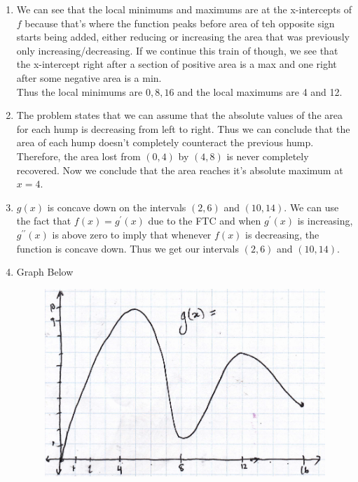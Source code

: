 \documentclass{article}
\begin{document}
\begin{enumerate}[label=\textbf{(2.\arabic*)}]
\begin{enumerate}[label=(\alph*)]
\item We can see that the local minimums and maximums are at the x-intercepts of $f$ because that's where the function peaks before area of teh opposite sign starts being added, either reducing or increasing the area that was previously only increasing/decreasing. If we continue this train of though, we see that the x-intercept right after a section of positive area is a max and one right after some negative area is a min. \\
Thus the local minimums are $0, 8, 16$ and the local maximums are 4 and 12.
\item The problem states that we can assume that the absolute values of the area for each hump is decreasing from left to right. Thus we can conclude that the area of each hump doesn't completely counteract the previous hump. Therefore, the area lost from $(0,4)$ by $(4, 8)$ is never completely recovered. Now we conclude that the area reaches it's absolute maximum at $x=4$.
\item $g(x)$ is concave down on the intervals $(2,6)$ and $(10,14)$. We can use the fact that $f(x)=g^\prime(x)$ due to the FTC and when $g^\prime(x)$ is increasing, $g^{\prime\prime}(x)$ is above zero to imply that whenever $f(x)$ is decreasing, the function is concave down. Thus we get our intervals $(2,6)$ and $(10,14)$.
\item Graph Below
\begin{figure}[H]
\centering
\includegraphics[scale=.25]{foursies}
\end{figure}
\end{enumerate}
\newpage %


\end{enumerate}
\end{document}
